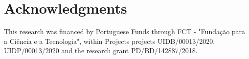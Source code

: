 
\section*{Acknowledgments}
This research was financed by Portuguese Funds through FCT - "Funda\c{c}\~{a}o para a Ci\^{e}ncia e a Tecnologia", within Projects projects UIDB/00013/2020, UIDP/00013/2020 and the research grant PD/BD/142887/2018.\\




\address{Gustavo Soutinho\\
EPIUnit\\
  Institute of Public Health of the University of Porto (ISPUP)\\
  Rua das Taipas 135, 4050-600 Porto\\
  Portugal\\
  ORCID: 0000-0002-0559-1327\\
  }

\address{Lu\'{i}s Meira-Machado\\
  Department of Mathematics \& Centre of Mathematics\\ University of Minho\\
  Campus de Azur\'{e}m - 4800-058 Guimar\~{a}es\\
  Portugal\\
  ORCID: 0000-0002-8577-7665\\
  }

